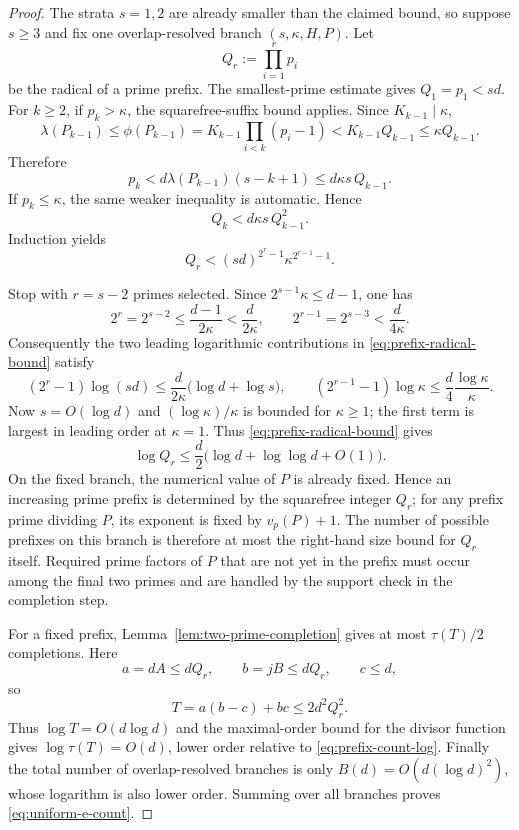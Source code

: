 \documentclass[11pt]{article}
\begin{document}
\begin{proof}
The strata $s=1,2$ are already smaller than the claimed bound, so suppose
$s\ge3$ and fix one overlap-resolved branch $(s,\kappa,H,P)$.  Let
\[
Q_r:=\prod_{i=1}^r p_i
\]
be the radical of a prime prefix.  The smallest-prime estimate gives
$Q_1=p_1<sd$.  For $k\ge2$, if $p_k>\kappa$, the squarefree-suffix bound applies.  Since
$K_{k-1}\mid\kappa$,
\[
\lambda(P_{k-1})\le\phi(P_{k-1})
=K_{k-1}\prod_{i<k}(p_i-1)
< K_{k-1}Q_{k-1}\le\kappa Q_{k-1}.
\]
Therefore
\[
p_k<d\lambda(P_{k-1})(s-k+1)
\le d\kappa s\,Q_{k-1}.
\]
If $p_k\le\kappa$, the same weaker inequality is automatic.  Hence
\[
Q_k<d\kappa s\,Q_{k-1}^2.
\]
Induction yields
\begin{equation}
Q_r<(sd)^{2^r-1}\kappa^{2^{r-1}-1}.
\label{eq:prefix-radical-bound}
\end{equation}

Stop with $r=s-2$ primes selected.  Since
$2^{s-1}\kappa\le d-1$, one has
\[
2^r=2^{s-2}\le\frac{d-1}{2\kappa}<\frac d{2\kappa},
\qquad
2^{r-1}=2^{s-3}<\frac d{4\kappa}.
\]
Consequently the two leading logarithmic contributions in
\eqref{eq:prefix-radical-bound} satisfy
\[
(2^r-1)\log(sd)\le
\frac d{2\kappa}\bigl(\log d+\log s\bigr),
\qquad
(2^{r-1}-1)\log\kappa\le
\frac d4\frac{\log\kappa}{\kappa}.
\]
Now $s=O(\log d)$ and $(\log\kappa)/\kappa$ is bounded for
$\kappa\ge1$; the first term is largest in leading order at $\kappa=1$.
Thus \eqref{eq:prefix-radical-bound} gives
\begin{equation}
\log Q_r
\le
\frac d2\bigl(\log d+\log\log d+O(1)\bigr).
\label{eq:prefix-count-log}
\end{equation}
On the fixed branch, the numerical value of $P$ is already fixed.  Hence an
increasing prime prefix is determined by the squarefree integer $Q_r$; for any
prefix prime dividing $P$, its exponent is fixed by $v_p(P)+1$.  The number of
possible prefixes on this branch is therefore at most the right-hand size bound
for $Q_r$ itself.  Required prime factors of $P$ that are not yet in the prefix
must occur among the final two primes and are handled by the support check in
the completion step.

For a fixed prefix, Lemma~\ref{lem:two-prime-completion} gives at most
$\tau(T)/2$ completions.  Here
\[
a=dA\le dQ_r,
\qquad
b=jB\le dQ_r,
\qquad
c\le d,
\]
so
\[
T=a(b-c)+bc\le2d^2Q_r^2.
\]
Thus $\log T=O(d\log d)$ and the maximal-order bound for the divisor
function gives $\log\tau(T)=O(d)$, lower order relative to
\eqref{eq:prefix-count-log}.  Finally the total number of overlap-resolved
branches is only $B(d)=O(d(\log d)^2)$, whose logarithm is also lower order.
Summing over all branches proves \eqref{eq:uniform-e-count}.
\end{proof}
\end{document}

